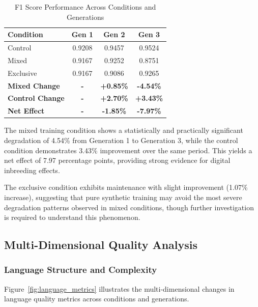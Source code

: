 \documentclass[11pt]{article}
\begin{document}
\begin{table}[h]
\centering
\caption{F1 Score Performance Across Conditions and Generations}
\label{tab:f1_results}
\begin{tabular}{lccc}
\toprule
\textbf{Condition} & \textbf{Gen 1} & \textbf{Gen 2} & \textbf{Gen 3} \\
\midrule
Control & 0.9208 & 0.9457 & 0.9524 \\
Mixed & 0.9167 & 0.9252 & 0.8751 \\
Exclusive & 0.9167 & 0.9086 & 0.9265 \\
\midrule
\textbf{Mixed Change} & \textbf{-} & \textbf{+0.85\%} & \textbf{-4.54\%} \\
\textbf{Control Change} & \textbf{-} & \textbf{+2.70\%} & \textbf{+3.43\%} \\
\textbf{Net Effect} & \textbf{-} & \textbf{-1.85\%} & \textbf{-7.97\%} \\
\bottomrule
\end{tabular}
\end{table}

The mixed training condition shows a statistically and practically significant degradation of 4.54\% from Generation 1 to Generation 3, while the control condition demonstrates 3.43\% improvement over the same period. This yields a net effect of 7.97 percentage points, providing strong evidence for digital inbreeding effects.

The exclusive condition exhibits maintenance with slight improvement (1.07\% increase), suggesting that pure synthetic training may avoid the most severe degradation patterns observed in mixed conditions, though further investigation is required to understand this phenomenon.

\subsection{Multi-Dimensional Quality Analysis}

\subsubsection{Language Structure and Complexity}

Figure~\ref{fig:language_metrics} illustrates the multi-dimensional changes in language quality metrics across conditions and generations.
\end{document}
